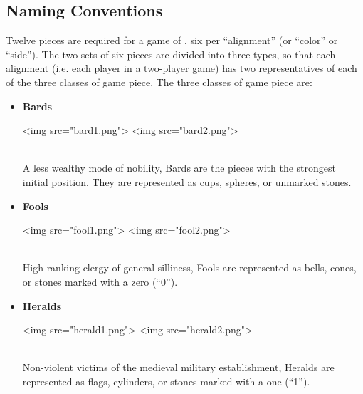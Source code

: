 %

\subsection{Naming Conventions}\label{pnames}
Twelve pieces are required for a game of \know, six per ``alignment''
(or ``color'' or ``side'').
The two sets of six pieces are divided into three types, so
that each alignment (i.e. each player in a two-player game) has two
representatives of each of the three classes of game piece.
The three classes of game piece are:

\newlength{\pieceheight}
\setlength{\pieceheight}{1.5em}

\begin{itemize}
\item
  {\bf Bards}
  \hfill
  \begin{rawhtml}
    <img src="bard1.png">
    <img src="bard2.png">
  \end{rawhtml}
  \\
  A less wealthy mode of nobility,
  Bards are the pieces with the strongest initial position.
  They are represented as cups, spheres, or unmarked stones.

  \item
    {\bf Fools}
    \hfill
    \begin{rawhtml}
      <img src="fool1.png">
      <img src="fool2.png">
    \end{rawhtml}
    \\
    High-ranking clergy of general silliness,
    Fools are represented as bells, cones, or stones marked
    with a zero (``0'').

  \item
    {\bf Heralds}
    \hfill
    \begin{rawhtml}
      <img src="herald1.png">
      <img src="herald2.png">
    \end{rawhtml}
    \\
    Non-violent victims of the medieval military establishment,
    Heralds are represented as flags, cylinders, or stones marked
    with a one (``1'').
\end{itemize}

